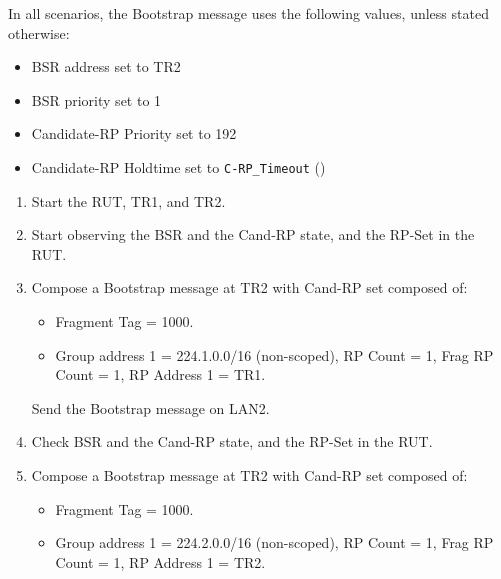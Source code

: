 \documentclass[11pt]{report}
\begin{document}

In all scenarios, the Bootstrap message uses the following values, unless
stated otherwise:

\begin{itemize}
  \item BSR address set to TR2
  \item BSR priority set to 1
  \item Candidate-RP Priority set to 192
  \item Candidate-RP Holdtime set to \verb=C-RP_Timeout= ({\PimsmCRPTimeout})
\end{itemize}


\begin{enumerate}

  \item Start the RUT, TR1, and TR2.

  \item Start observing the BSR and the Cand-RP state, and the RP-Set in the
  RUT.

  \item Compose a Bootstrap message at TR2 with Cand-RP set composed of:

  \begin{itemize}

    \item Fragment Tag = 1000.

    \item Group address 1 = 224.1.0.0/16 (non-scoped),
    RP Count = 1, Frag RP Count = 1, RP Address 1 = TR1.

  \end{itemize}

  Send the Bootstrap message on LAN2.

  \item Check BSR and the Cand-RP state, and the RP-Set in the RUT.

  \item Compose a Bootstrap message at TR2 with Cand-RP set composed of:

  \begin{itemize}

    \item Fragment Tag = 1000.

    \item Group address 1 = 224.2.0.0/16 (non-scoped),
    RP Count = 1, Frag RP Count = 1, RP Address 1 = TR2.


\end{itemize}
\end{enumerate}
\end{document}
